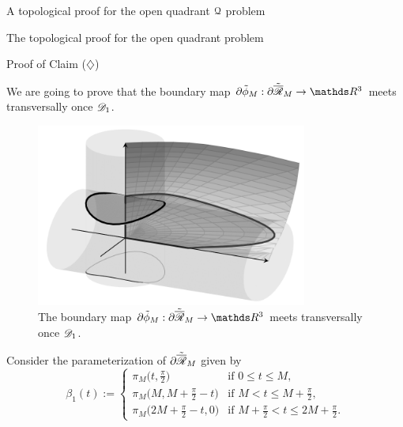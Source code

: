 \documentclass[11pt, a4paper, english, twoside, notitlepage, openright]{report}
\begin{document}
\begin{chapter}{A topological proof for the open quadrant $\mathcal{Q}$ problem}
\begin{section}{The topological proof for the open quadrant problem}
\begin{subsection}{Proof of Claim ($\diamondsuit$)}
\begin{lemma}
\begin{Proof}
\vspace{1mm}

We are going to prove that the boundary map $\partial\tilde{\phi}_M:\partial\tilde{\overline{\Rr}}_M\rightarrow\R^3$ meets transversally once $\mathscr{D}_1$.

\begin{figure}[!ht]
\begin{center}
\includegraphics[height=6cm]{plots/ch3_02_B2.png}
\end{center}
\caption{The boundary map $\partial\tilde{\phi}_M:\partial\tilde{\overline{\Rr}}_M\rightarrow\R^3$ meets transversally once $\mathscr{D}_1$.}
\end{figure}

Consider the parameterization of $\partial\tilde{\overline{\mathscr{R}}}_M$ given by
$$
\beta_1(t):=
\begin{cases}
\pi_M\big(t,\frac{\pi}{2}\big) &\text{if $0\le t\le M$},\\
\pi_M\big(M,M+\frac{\pi}{2}-t\big) &\text{if $M<t\le M+\frac{\pi}{2}$},\\
\pi_M\big(2M+\frac{\pi}{2}-t,0\big) &\text{if $M+\frac{\pi}{2}<t\le 2M+\frac{\pi}{2}$}.
\end{cases}
$$ 


\end{Proof}
\end{lemma}
\end{subsection}
\end{section}
\end{chapter}
\end{document}

